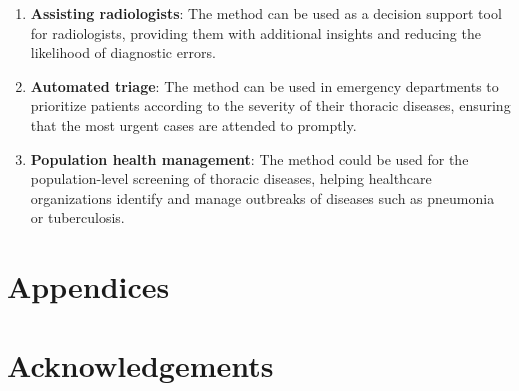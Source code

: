     \begin{enumerate}
        \item \textbf{Assisting radiologists}: The method can be used as a decision support tool for radiologists, providing them with additional insights and reducing the likelihood of diagnostic errors.

        \item \textbf{Automated triage}: The method can be used in emergency departments to prioritize patients according to the severity of their thoracic diseases, ensuring that the most urgent cases are attended to promptly.

        \item \textbf{Population health management}: The method could be used for the population-level screening of thoracic diseases, helping healthcare organizations identify and manage outbreaks of diseases such as pneumonia or tuberculosis.
    \end{enumerate}


\section*{Appendices}
\section*{Acknowledgements}

